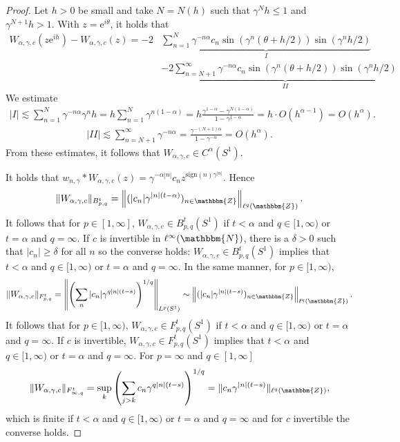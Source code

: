 \documentclass[10pt]{amsart}
\theoremstyle{remark}
\theoremstyle{definition}
\begin{document}
\begin{proof}
Let $h>0$ be small and take $N=N(h)$ such that $\gamma^N h\leq 1$ and $\gamma^{N+1}h >1$. With $z={\mathrm{e}}^{i\theta}$, it holds that
\begin{align*}
W_{\alpha,\gamma,c}(z{\mathrm{e}}^{ih})-W_{\alpha,\gamma,c}(z)=-2&\underbrace{\sum_{n=1}^N \gamma^{-n\alpha}c_n \sin (\gamma^n(\theta+h/2))\sin(\gamma^nh/2) }_{I}\\
&-2\underbrace{\sum_{n=N+1}^\infty \gamma^{-n\alpha}c_n \sin (\gamma^n(\theta+h/2))\sin(\gamma^nh/2) }_{II}
\end{align*}
We estimate
\begin{align*}
|I|\lesssim \sum_{n=1}^N \gamma^{-n\alpha}\gamma^n h=h\sum_{n=1}^N\gamma^{n(1-\alpha)}=h\frac{\gamma^{1-\alpha}-\gamma^{N(1-\alpha)}}{1-\gamma^{1-\alpha}}=h\cdot O(h^{\alpha-1})=O(h^\alpha).
\end{align*}
\begin{align*}
|II|\lesssim \sum_{n=N+1}^\infty \gamma^{-n\alpha} =\frac{\gamma^{-(N+1)\alpha}}{1-\gamma^{-\alpha}}=O(h^\alpha).
\end{align*}
From these estimates, it follows that $W_{\alpha,\gamma,c}\in C^\alpha(S^1)$.

It holds that $w_{n,\gamma}*W_{\alpha,\gamma,c}(z)=\gamma^{-\alpha|n|}c_nz^{\mathrm{sign}(n)\gamma^{|n|}}$. Hence
$$\|W_{\alpha,\gamma,c}\|_{B^t_{p,q}}=\left\|(|c_n|\gamma^{|n|(t-\alpha)})_{n\in {\mathbbm{Z}}}\right\|_{\ell^q({\mathbbm{Z}})}.$$
It follows that for $p\in [1,\infty]$, $W_{\alpha,\gamma,c}\in B^t_{p,q}(S^1)$ if $t<\alpha$ and $q\in[1,\infty)$ or $t=\alpha$ and $q=\infty$. If $c$ is invertible in $\ell^{\infty}({\mathbbm{N}})$, there is a $\delta>0$ such that $|c_n|\geq \delta$ for all $n$ so the converse holds: $W_{\alpha,\gamma,c}\in B^t_{p,q}(S^1)$ implies that $t<\alpha$ and $q\in[1,\infty)$ or $t=\alpha$ and $q=\infty$. In the same manner, for $p\in [1,\infty)$,
$$\|W_{\alpha,\gamma,c}\|_{F^t_{p,q}}=\left\| \left(\sum_{n} |c_n|\gamma^{q|n|(t-s)}\right)^{1/q}\right\|_{L^p(S^1)}\sim \left\|(|c_n|\gamma^{|n|(t-s)})_{n\in {\mathbbm{Z}}}\right\|_{\ell^q({\mathbbm{Z}})}.$$
It follows that for $p\in [1,\infty)$, $W_{\alpha,\gamma,c}\in F^t_{p,q}(S^1)$ if $t<\alpha$ and $q\in[1,\infty)$ or $t=\alpha$ and $q=\infty$. If $c$ is invertible, $W_{\alpha,\gamma,c}\in F^t_{p,q}(S^1)$ implies that $t<\alpha$ and $q\in[1,\infty)$ or $t=\alpha$ and $q=\infty$. For $p=\infty$ and $q\in [1,\infty]$
$$\|W_{\alpha,\gamma,c}\|_{F^t_{\infty,q}}=\sup_k \left(\sum_{j>k} c_n\gamma^{q|n|(t-s)}\right)^{1/q}= \|c_n\gamma^{|n|(t-s)}\|_{\ell^q({\mathbbm{Z}})},$$
which is finite if $t<\alpha$ and $q\in[1,\infty)$ or $t=\alpha$ and $q=\infty$ and for $c$ invertible the converse holds.
\end{proof}
\end{document}
